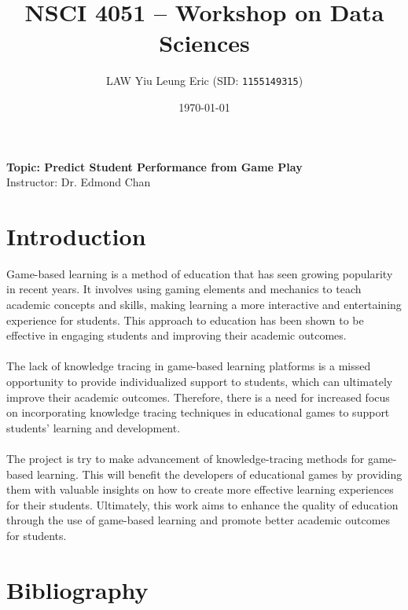 \documentclass[11pt,a4paper]{article}
\begin{document}
    
    \thispagestyle{empty}
    \title{\textsc{NSCI 4051} -- Workshop on Data Sciences}
    \author{
        LAW Yiu Leung Eric (SID: \texttt{1155149315})
    }
    \date{\today}
    \maketitle

    \begin{center}
        \textbf{Topic: Predict Student Performance from Game Play} \\
        Instructor: Dr. Edmond Chan
    \end{center}
    
    \pagestyle{plain} 
    
    \tableofcontents
    \listoffigures
    \listoftables
    
    \newpage
    
    \pagestyle{fancy}
    \setcounter{page}{1}
    
    \section{Introduction}
    Game-based learning is a method of education that has seen growing popularity in recent years. It involves using gaming elements and mechanics to teach academic concepts and skills, making learning a more interactive and entertaining experience for students. This approach to education has been shown to be effective in engaging students and improving their academic outcomes. \\
    \\
    The lack of knowledge tracing in game-based learning platforms is a missed opportunity to provide individualized support to students, which can ultimately improve their academic outcomes. Therefore, there is a need for increased focus on incorporating knowledge tracing techniques in educational games to support students' learning and development. \\
    \\
    The project is try to make advancement of knowledge-tracing methods for game-based learning. This will benefit the developers of educational games by providing them with valuable insights on how to create more effective learning experiences for their students. Ultimately, this work aims to enhance the quality of education through the use of game-based learning and promote better academic outcomes for students.
    
    
    \section{Bibliography}
    
    
\end{document}
